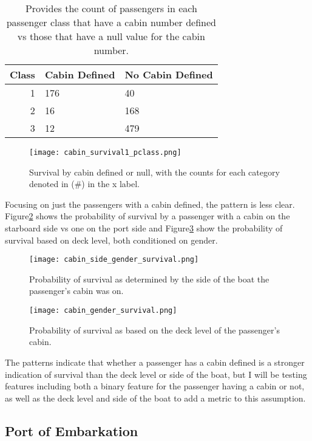 \documentclass[12pt, letterpaper]{article}
\begin{document}
\begin{table}[H]
    \centering
    \begin{tabular}{rll}
    Class & Cabin Defined & No Cabin Defined \\
    \hline
    1 & 176 & 40 \\
    2 & 16 & 168 \\
    3 & 12 & 479
    \end{tabular}
    \caption{Provides the count of passengers in each passenger class that have a cabin number defined vs those that have a null value for the cabin number.}
    \label{tab:cabin}
\end{table}

\begin{figure}[H]
    \centering
    \texttt{[image: cabin\_survival1\_pclass.png]}
    \caption{Survival by cabin defined or null, with the counts for each category denoted in (\#) in the x label. }
    \label{fig:cabin_prob}
\end{figure}

Focusing on just the passengers with a cabin defined, the pattern is less clear. Figure\ref{fig:cabin_side} shows the probability of survival by a passenger with a cabin on the starboard side vs one on the port side and Figure\ref{fig:cabin_deck} show the probability of survival based on deck level, both conditioned on gender.

\begin{figure}[H]
    \centering
    \texttt{[image: cabin\_side\_gender\_survival.png]}
    \caption{Probability of survival as determined by the side of the boat the passenger's cabin was on. }
    \label{fig:cabin_side}
\end{figure}

\begin{figure}[H]
    \centering
    \texttt{[image: cabin\_gender\_survival.png]}
    \caption{Probability of survival as based on the deck level of the passenger's cabin.}
    \label{fig:cabin_deck}
\end{figure}

The patterns indicate that whether a passenger has a cabin defined is a stronger indication of survival than the deck level or side of the boat, but I will be testing features including both a binary feature for the passenger having a cabin or not, as well as the deck level and side of the boat to add a metric to this assumption.

\subsection{Port of Embarkation}
\end{document}
